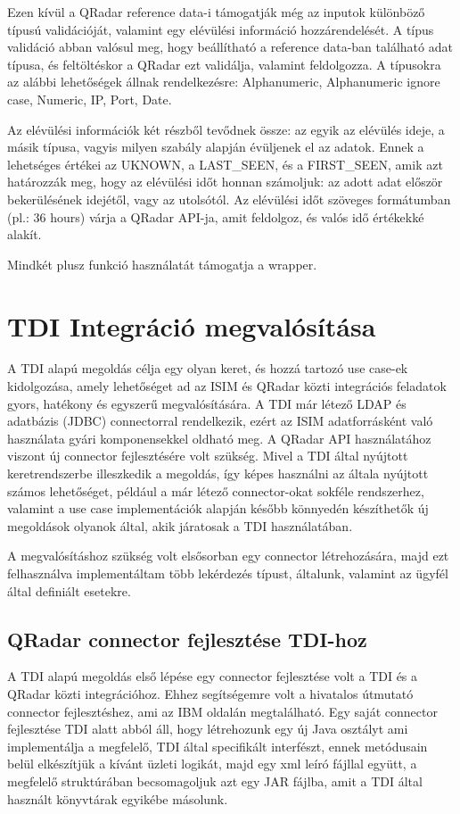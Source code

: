 Ezen kívül a QRadar reference data-i támogatják még az inputok különböző típusú validációját, valamint egy elévülési információ hozzárendelését. A típus validáció abban valósul meg, hogy beállítható a reference data-ban található adat típusa, és feltöltéskor a QRadar ezt validálja, valamint feldolgozza. A típusokra az alábbi lehetőségek állnak rendelkezésre: Alphanumeric, Alphanumeric ignore case, Numeric, IP, Port, Date. 

Az elévülési információk két részből tevődnek össze: az egyik az elévülés ideje, a másik típusa, vagyis milyen szabály alapján évüljenek el az adatok. Ennek a lehetséges értékei az UKNOWN, a LAST\_SEEN, és a FIRST\_SEEN, amik azt határozzák meg, hogy az elévülési időt honnan számoljuk: az adott adat először bekerülésének idejétől, vagy az utolsótól. Az elévülési időt szöveges formátumban (pl.: 36 hours) várja a QRadar API-ja, amit feldolgoz, és valós idő értékekké alakít.

Mindkét plusz funkció használatát támogatja a wrapper.

\section{TDI Integráció megvalósítása}
A TDI alapú megoldás célja egy olyan keret, és hozzá tartozó use case-ek kidolgozása, amely lehetőséget ad az ISIM és QRadar közti integrációs feladatok gyors, hatékony és egyszerű megvalósítására. 
A TDI már létező LDAP és adatbázis (JDBC) connectorral rendelkezik, ezért az ISIM adatforrásként való használata gyári komponensekkel oldható meg. A QRadar API használatához viszont új connector fejlesztésére volt szükség.
Mivel a TDI által nyújtott keretrendszerbe illeszkedik a megoldás, így képes használni az általa nyújtott számos lehetőséget, például a már létező connector-okat sokféle rendszerhez, valamint a use case implementációk alapján később könnyedén készíthetők új megoldások olyanok által, akik járatosak a TDI használatában. 

A megvalósításhoz szükség volt elsősorban egy connector létrehozására, majd ezt felhasználva implementáltam több lekérdezés típust, általunk, valamint az ügyfél által definiált esetekre.
 
\subsection{QRadar connector fejlesztése TDI-hoz}

A TDI alapú megoldás első lépése egy connector fejlesztése volt a TDI és a QRadar közti integrációhoz. Ehhez segítségemre volt a hivatalos útmutató connector fejlesztéshez, ami az IBM oldalán megtalálható. Egy saját connector fejlesztése TDI alatt abból áll, hogy létrehozunk egy új Java osztályt ami implementálja a megfelelő, TDI által specifikált interfészt, ennek metódusain belül elkészítjük a kívánt üzleti logikát, majd egy xml leíró fájllal együtt, a megfelelő struktúrában becsomagoljuk azt egy JAR fájlba, amit a TDI által használt könyvtárak egyikébe másolunk. 

